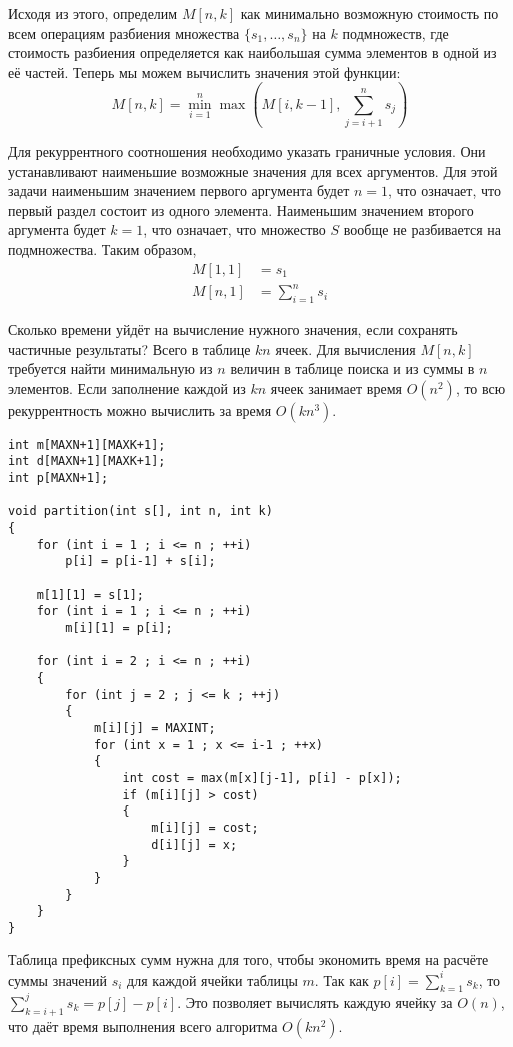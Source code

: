 \documentclass[14pt,openany]{book}
\begin{document}
Исходя из этого, определим $M[n, k]$ как минимально возможную стоимость по всем операциям
разбиения множества $\{s_1, \ldots , s_n\}$ на $k$ подмножеств, где стоимость разбиения
определяется как наибольшая сумма элементов в одной из её частей. Теперь мы можем вычислить
значения этой функции:
$$ M[n,k] = \min_{i=1}^{n}\max\left(M[i,k-1], \sum_{j=i+1}^{n}s_j\right)$$

Для рекуррентного соотношения необходимо указать граничные условия. Они устанавливают
наименьшие возможные значения для всех аргументов. Для этой задачи наименьшим значением
первого аргумента будет $n=1$, что означает, что первый раздел состоит из одного элемента.
Наименьшим значением второго аргумента будет $k=1$, что означает, что множество $S$
вообще не разбивается на подмножества. Таким образом,
\begin{align*}
M[1,1] &= s_1 \\
M[n,1] &= \sum_{i=1}^{n}s_i
\end{align*}

Сколько времени уйдёт на вычисление нужного значения, если сохранять частичные результаты?
Всего в таблице $kn$ ячеек. Для вычисления $M[n,k]$ требуется найти минимальную из $n$ величин
в таблице поиска и из суммы в $n$ элементов. Если заполнение каждой из $kn$ ячеек занимает время 
$O(n^2)$, то всю рекуррентность можно вычислить за время $O(kn^3)$.

\begin{lstlisting}
int m[MAXN+1][MAXK+1];
int d[MAXN+1][MAXK+1];
int p[MAXN+1];

void partition(int s[], int n, int k)
{
    for (int i = 1 ; i <= n ; ++i)
        p[i] = p[i-1] + s[i];

    m[1][1] = s[1];
    for (int i = 1 ; i <= n ; ++i)
        m[i][1] = p[i];

    for (int i = 2 ; i <= n ; ++i)
    {
        for (int j = 2 ; j <= k ; ++j)
        {
            m[i][j] = MAXINT;
            for (int x = 1 ; x <= i-1 ; ++x)
            {
                int cost = max(m[x][j-1], p[i] - p[x]);
                if (m[i][j] > cost)
                {
                    m[i][j] = cost;
                    d[i][j] = x;
                }
            }
        }
    }
}
\end{lstlisting}

Таблица префиксных сумм нужна для того, чтобы экономить время на расчёте суммы
значений $s_i$ для каждой ячейки таблицы $m$. Так как $p[i] = \sum_{k=1}^{i}s_k$,
то $\sum_{k=i+1}^{j}s_k = p[j] - p[i]$. Это позволяет вычислять каждую ячейку за
$O(n)$, что даёт время выполнения всего алгоритма $O(kn^2)$.
\end{document}
